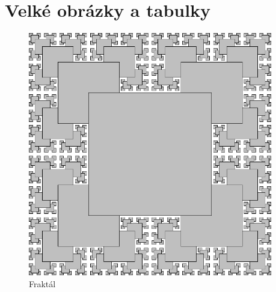 \documentclass[czech,bachelor,dept460,male,cpp,cpdeclaration]{diploma}
\begin{document}
\section{Velké obrázky a tabulky}
\label{sec:Appendix1}
\begin{figure}[!h]
	\centering
	\includegraphics[width=0.95\textwidth]{Figures/FigC.pdf}
	\caption{Fraktál}
	\label{fig:TSquareFractal}
\end{figure}
\end{document}
